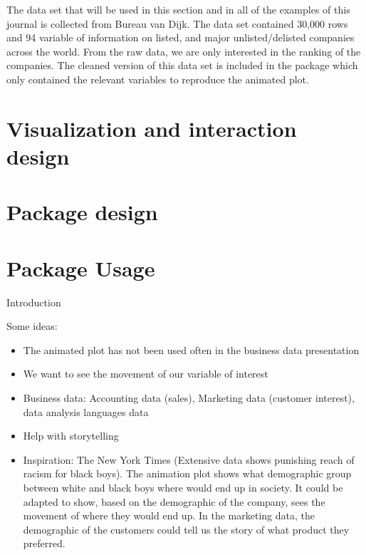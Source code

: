 The data set that will be used in this section and in all of the examples of this journal is collected from Bureau van Dijk. The data set contained 30,000 rows and 94 variable of information on listed, and major unlisted/delisted companies across the world. From the raw data, we are only interested in the ranking of the companies. The cleaned version of this data set is included in the package which only contained the relevant variables to reproduce the animated plot.

\hypertarget{visualization-and-interaction-design}{%
\section{Visualization and interaction design}\label{visualization-and-interaction-design}}

\hypertarget{package-design}{%
\section{Package design}\label{package-design}}

\hypertarget{package-usage}{%
\section{Package Usage}\label{package-usage}}

Introduction

Some ideas:

\begin{itemize}
\tightlist
\item
  The animated plot has not been used often in the business data presentation
\item
  We want to see the movement of our variable of interest
\item
  Business data: Accounting data (sales), Marketing data (customer interest), data analysis languages data
\item
  Help with storytelling
\item
  Inspiration: The New York Times (Extensive data shows punishing reach of racism for black boys). The animation plot shows what demographic group between white and black boys where would end up in society. It could be adapted to show, based on the demographic of the company, sees the movement of where they would end up. In the marketing data, the demographic of the customers could tell us the story of what product they preferred.
\end{itemize}

